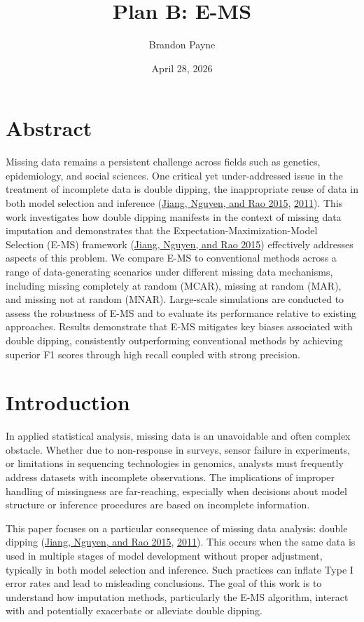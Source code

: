 \documentclass[
  12pt,
]{article}
\title{Plan B: E-MS}
\subtitle{A THESIS SUBMITTED IN PARTIAL FULFILLMENT OF THE REQUIREMENTS
FOR THE DEGREE OF MASTER OF PUBLIC HEALTH DATASCIENCE

Committee:

Dr.~J. Sunil Rao (Plan B Advisor) 

Dr.~Lynn Eberly (Academic
Advisor) 

Dr.~Weihong Tang}
\author{Brandon Payne}
\date{April 28, 2026}
\begin{document}
\maketitle

\newpage

\hypertarget{abstract}{%
\section*{Abstract}\label{abstract}}

Missing data remains a persistent challenge across fields such as
genetics, epidemiology, and social sciences. One critical yet
under-addressed issue in the treatment of incomplete data is double
dipping, the inappropriate reuse of data in both model selection and
inference (\protect\hyperlink{ref-Sunilems}{Jiang, Nguyen, and Rao
2015}, \protect\hyperlink{ref-jiang2011best}{2011}). This work
investigates how double dipping manifests in the context of missing data
imputation and demonstrates that the Expectation-Maximization-Model
Selection (E-MS) framework (\protect\hyperlink{ref-Sunilems}{Jiang,
Nguyen, and Rao 2015}) effectively addresses aspects of this problem.
We compare E-MS to conventional methods across a range of
data-generating scenarios under different missing data mechanisms,
including missing completely at random (MCAR), missing at random (MAR),
and missing not at random (MNAR). Large-scale simulations are conducted
to assess the robustness of E-MS and to evaluate its performance
relative to existing approaches. Results demonstrate that E-MS mitigates
key biases associated with double dipping, consistently outperforming
conventional methods by achieving superior F1 scores through high recall
coupled with strong precision.

\section{Introduction}

In applied statistical analysis, missing data is an unavoidable and
often complex obstacle. Whether due to non-response in surveys, sensor
failure in experiments, or limitations in sequencing technologies in
genomics, analysts must frequently address datasets with incomplete
observations. The implications of improper handling of missingness are
far-reaching, especially when decisions about model structure or
inference procedures are based on incomplete information.

This paper focuses on a particular consequence of missing data analysis:
double dipping (\protect\hyperlink{ref-Sunilems}{Jiang, Nguyen, and Rao
2015}, \protect\hyperlink{ref-jiang2011best}{2011}). This occurs when
the same data is used in multiple stages of model development without
proper adjustment, typically in both model selection and inference. Such
practices can inflate Type I error rates and lead to misleading
conclusions. The goal of this work is to understand how imputation
methods, particularly the E-MS algorithm, interact with and potentially
exacerbate or alleviate double dipping.
\end{document}
